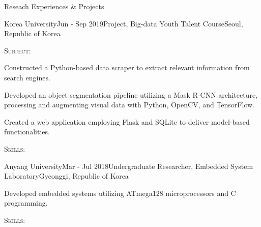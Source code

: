 \documentclass[
	a4paper, %
	11pt, %
]{resume} %
\begin{document}
\begin{rSection}{Reseach Experiences \& Projects}
	\begin{rSubsection}{Korea University}{Jun - Sep 2019}{Project, Big-data Youth Talent Course}{Seoul, Republic of Korea}
		\item {\textsc{Subject:}}
		\item {Constructed a Python-based data scraper to extract relevant information from search engines.}
		\item {Developed an object segmentation pipeline utilizing a Mask R-CNN architecture, processing and augmenting visual data with Python, OpenCV, and TensorFlow.}
		\item {Created a web application employing Flask and SQLite to deliver model-based functionalities.}
		\item {\textsc{Skills:}}
	\end{rSubsection}


	\begin{rSubsection}{Anyang University}{Mar - Jul 2018}{Undergraduate Researcher, Embedded System Laboratory}{Gyeonggi, Republic of Korea}
		\item {Developed embedded systems utilizing ATmega128 microprocessors and C programming.}
		\item {\textsc{Skills:}}
	\end{rSubsection}

\end{rSection}

\end{document}
